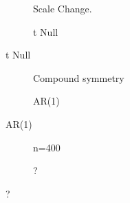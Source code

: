 \documentclass[12pt,a4paper]{article}
\begin{document}
\begin{figure}[h]
\centering
\caption{\footnotesize [TODO].}	
	\begin{subfigure}{.5\textwidth}
	  \centering
	  \caption{Scale Change.}  %
	\end{subfigure}%
	\begin{subfigure}{.5\textwidth}
	  \centering
	  \caption{t Null} %
	\end{subfigure}
\end{figure}



\begin{figure}[h]
\centering
\caption{\footnotesize [TODO].}	
	\begin{subfigure}{.5\textwidth}
	  \centering
	  \caption{Compound symmetry}  
	\end{subfigure}%
	\begin{subfigure}{.5\textwidth}
	  \centering
	  \caption{AR(1)} %
	\end{subfigure}
\end{figure}



\begin{figure}[h]
\centering
\caption{\footnotesize [TODO].}	
	\begin{subfigure}{.5\textwidth}
	  \centering
	  \caption{n=400}  %
	\end{subfigure}%
	\begin{subfigure}{.5\textwidth}
	  \centering
	  \caption{?} %
	\end{subfigure}
\end{figure}
\end{document}

